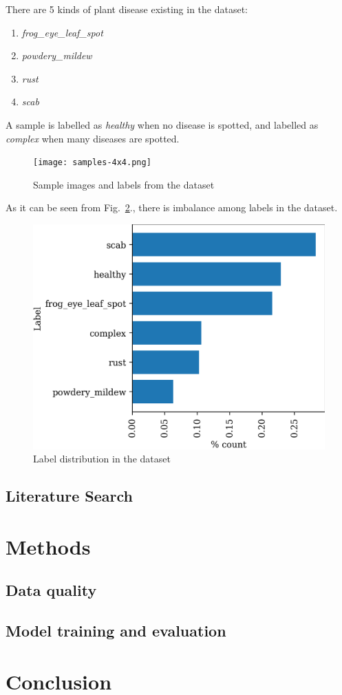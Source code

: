 \documentclass[conference]{IEEEtran}
\begin{document}
There are 5 kinds of plant disease existing in the dataset:
\begin{enumerate}
\item \textit{frog\_eye\_leaf\_spot}
\item \textit{powdery\_mildew}
\item \textit{rust}
\item \textit{scab}
\end{enumerate}

A sample is labelled as \textit{healthy} when no disease is spotted, 
and labelled as \textit{complex} when many diseases are spotted.

\begin{figure}
    \centerline{\texttt{[image: samples-4x4.png]}}
    \caption{Sample images and labels from the dataset}
    \label{fig:samples}
\end{figure}

As it can be seen from Fig.~\ref{fig:label-dist}., there is imbalance among labels in the dataset.

\begin{figure}
    \centerline{\includegraphics[width = 0.45 \textwidth]{label-dist-ratio.png}}
    \caption{Label distribution in the dataset}
    \label{fig:label-dist}
\end{figure}


\subsection{Literature Search}

\section{Methods}

\subsection{Data quality}

\subsection{Model training and evaluation}


\section{Conclusion}



\end{document}
